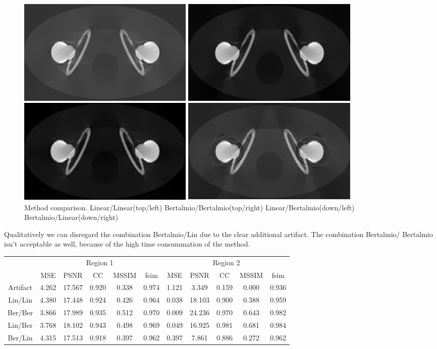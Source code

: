\begin{figure}[H]
\centering
\includegraphics[scale=0.7]{img/method_comp}
\caption{{Method comparison. Linear/Linear(top/left) Bertalmio/Bertalmio(top/right) Linear/Bertalmio(down/left) Bertalmio/Linear(down/right)}}\label{method_comp}
\end{figure}

Qualitatively we can disregard the combination Bertalmio/Lin due to the clear additional artifact. The combination Bertalmio/ Bertalmio isn't acceptable as well, because of the high time consummation of the method.

\begin{adjustwidth}{-1in}{-1in}
\centering
\begin{tabular}{c|c|c|c|c|c|c|c|c|c|c|}
\cline{2-11}
& \multicolumn{5}{|c|}{Region 1} & \multicolumn{5}{|c|}{Region 2} \\
\cline{2-11}
& MSE & PSNR & CC & MSSIM & fsim  & MSE & PSNR & CC & MSSIM & fsim  \\
\hline
\multicolumn{1}{|c|}{Artifact} & 4.262	& 17.567 &0.920	&0.338	&0.974	&1.121	&3.349	&0.159	&0.000	&0.936 \\
\multicolumn{1}{|c|}{Lin/Lin} &4.380	&17.448	&0.924	&0.426	&0.964	&0.038	&18.103	&0.900	&0.388	&0.959 \\
\multicolumn{1}{|c|}{Ber/Ber} &3.866	&17.989	&0.935	&0.512	&0.970	&0.009	&24.236	&0.970	&0.643	&0.982 \\
\multicolumn{1}{|c|}{Lin/Ber} &3.768	&18.102	&0.943	&0.498	&0.969	&0.049	&16.925	&0.981	&0.681	&0.984 \\
\multicolumn{1}{|c|}{Ber/Lin} &4.315	&17.513	&0.918	&0.397	&0.962	&0.397	&7.861	&0.886	&0.272	&0.962 \\
\hline
\end{tabular}
\end{adjustwidth}
\medskip

